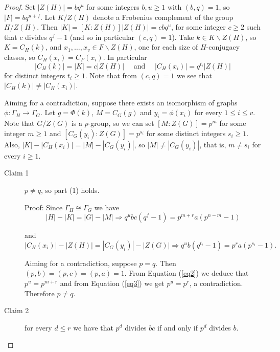 \documentclass[12pt]{amsart}
\theoremstyle{definition}
\theoremstyle{remark}
\theoremstyle{plain}
\theoremstyle{plain}
\theoremstyle{plain}
\theoremstyle{plain}
\theoremstyle{plain}
\theoremstyle{remark}
\theoremstyle{remark}
\theoremstyle{definition}
\begin{document}
\begin{proof}
Set $|Z(H)| = bq^u$ for some integers $b, u \geq 1$ with $(b,q)=1$, so $|F| = bq^{u+f}$.  
Let $K/Z(H)$ denote a Frobenius complement of the group $H/Z(H)$. Then 
$|K| = [K \colon Z(H)]|Z(H)| = cbq^u$, for some integer $c\geq 2$ such that  $c$ divides $q^f -1$ (and so in particular $(c,q) = 1$). 
Take $k \in K \backslash Z(H)$, so $K = C_H(k)$, and $x_1, \dots, x_v \in F \backslash Z(H)$, one for each size of $H$-conjugacy classes, so $C_H(x_i) = C_F(x_i)$. In particular 
\[|C_H(k)| = |K| = c|Z(H)| \quad \text{ and } \quad |C_H(x_i)| = q^{t_i}|Z(H)|\] for distinct integers $t_i\geq 1$. Note that from $(c,q)=1$ we see that $|C_H(k)| \neq |C_H(x_i)|$.

Aiming for a contradiction, suppose there exists an isomorphism of graphs
$\phi \colon \Gamma_H \rightarrow \Gamma_G$. Let $g= \Phi(k)$, $M=C_G(g)$ and $y_i=\phi(x_i)$ for every $1 \leq i \leq v$. Note that $G/Z(G)$ is a $p$-group, so we can set $[M \colon Z(G)] = p^m$  for some integer $m\geq 1$ and $[C_G(y_i) \colon Z(G)]=p^{s_i}$ for some distinct integers $s_i\geq 1$.
Also, $|K| - |C_H(x_i)| = |M| - |C_G(y_i)|$, so $|M| \neq |C_G(y_i)|$, that is, $m \neq s_i$ for every $i\geq 1$.

\begin{description}
\item[Claim 1] $p \neq q$, so part (1) holds.

\smallskip
\noindent
Proof: 
Since $\Gamma_H \cong \Gamma_G$ we have
\begin{equation}\label{eq2}|H| - |K| = |G| - |M| \Longrightarrow
q^ubc(q^f- 1) = p^{m+r}a(p^{n-m}- 1)\end{equation}

\vspace{0.2cm}
and
\begin{equation}\label{eq3} |C_H(x_i)| - |Z(H)| = |C_G(y_i)| - |Z(G)| \Longrightarrow
q^ub(q^{t_i} - 1) = p^{r}a(p^{s_i}- 1) .\end{equation}

Aiming for a contradiction, suppose $p=q$. Then $(p,b)=(p,c)=(p,a)=1$. From Equation (\ref{eq2}) we deduce that $p^ u = p^{m+r}$ and  from Equation (\ref{eq3}) we get $p^ u = p^{r}$, a contradiction. Therefore $p\neq q$.

\bigskip
\item[Claim 2] for every $d\leq r$ we have that $p^d$ divides $bc$ if and only if $p^d$ divides $b$.


\end{description}
\end{proof}
\end{document}

